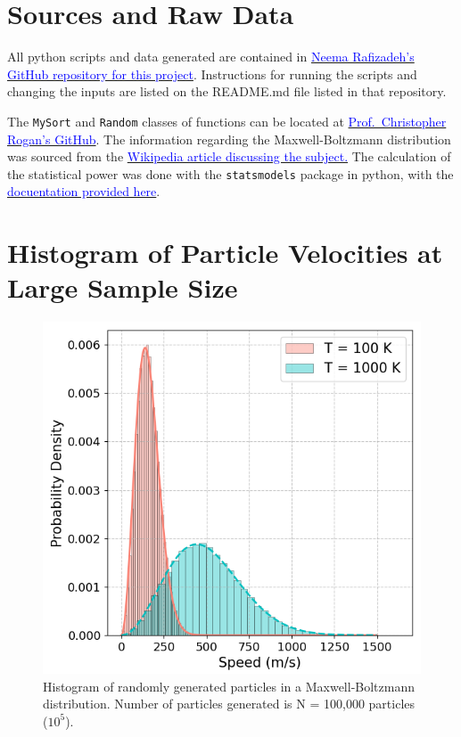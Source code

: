 \documentclass[%
 reprint,
 amsmath,amssymb,
 aps,
]{revtex4-2}
\begin{document}
\appendix
\section{Sources and Raw Data}

All python scripts and data generated are contained in \href{https://github.com/rafizadehn/PHSX815_Project1}{\textcolor{blue}{Neema Rafizadeh's GitHub repository for this project}}. Instructions for running the scripts and changing the inputs are listed on the README.md file listed in that repository. 

The \lstinline{MySort} and \lstinline{Random} classes of functions can be located at \href{https://github.com/crogan/PHSX815_Week2}{\textcolor{blue}{Prof.\ Christopher Rogan's GitHub}}. The information regarding the Maxwell-Boltzmann distribution was sourced from the \href{https://en.wikipedia.org/wiki/Maxwell%E2%80%93Boltzmann_distribution}{\textcolor{blue}{Wikipedia article discussing the subject.}} The calculation of the statistical power was done with the \lstinline{statsmodels} package in python, with the \href{https://www.statsmodels.org/dev/generated/statsmodels.stats.power.tt_ind_solve_power.html}{\textcolor{blue}{docuentation provided here}}. 

\section{Histogram of Particle Velocities at Large Sample Size}

\begin{figure}[H]
	\caption{Histogram of randomly generated particles in a Maxwell-Boltzmann distribution. Number of particles generated is N = 100,000 particles ($10^5$).}
	\centering
	\includegraphics[scale=0.5]{appendix1.png}
\end{figure}
\end{document}
